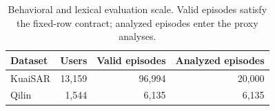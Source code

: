 \begin{table}[t]
\centering
\caption{Behavioral and lexical evaluation scale. Valid episodes satisfy
the fixed-row contract; analyzed episodes enter the proxy analyses.}
\label{tab:audit-scale}
\small
\begin{tabular*}{\columnwidth}{@{\extracolsep{\fill}}lrrr@{}}
\toprule
Dataset & Users & Valid episodes & Analyzed episodes \\
\midrule
KuaiSAR & 13,159 & 96,994 & 20,000 \\
Qilin   & 1,544  & 6,135  & 6,135 \\
\bottomrule
\end{tabular*}
\end{table}
